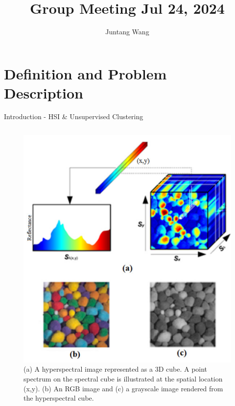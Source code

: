 \documentclass[10pt,svgnames,fragile]{beamer}
\subtitle{}
\institute[]{SOTA Report \$ Implement: \newline Clustering for Hyperspectral Image Analysis}
\author{Juntang Wang}
\date{}
\title{Group Meeting Jul 24, 2024}
\begin{document}
\maketitle

\section{Definition and Problem Description}
\begin{frame}{Introduction - HSI \& Unsupervised Clustering}
    \begin{columns}
        \begin{column}{0.38\textwidth}
            \begin{figure}
            \centering
            \includegraphics[width=1\linewidth]{HSI_example.png}
            \caption{(a) A hyperspectral image represented as a 3D cube. A point spectrum on the spectral cube is illustrated at the spatial location (x,y). (b) An RGB image and (c) a grayscale image rendered from the hyperspectral cube.\cite{khanModernTrendsHyperspectral2018}}
            \label{fig:khan-modern}
            \end{figure}
        \end{column}


\end{columns}
\end{frame}
\end{document}
